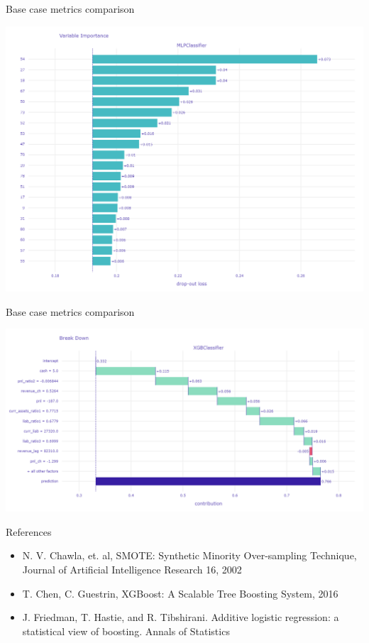 \documentclass{beamer}
\begin{document}
\begin{frame}{Base case metrics comparison}


\begin{center}
\includegraphics[scale=0.2]{img/mlpc_exp.png}
\end{center}
\end{frame}

\begin{frame}{Base case metrics comparison}


\begin{center}
\includegraphics[scale=0.3]{img/energia_plot.png}
\end{center}
\end{frame}

\begin{frame}{References}

\begin{itemize}
\item N. V. Chawla, et. al, SMOTE: Synthetic Minority Over-sampling Technique, Journal of Artificial Intelligence Research 16, 2002
\item T. Chen, C. Guestrin, XGBoost: A Scalable Tree Boosting System, 2016
\item J. Friedman, T. Hastie, and R. Tibshirani. Additive logistic
regression: a statistical view of boosting. Annals of
Statistics
\end{itemize}
\end{frame}
\end{document}
